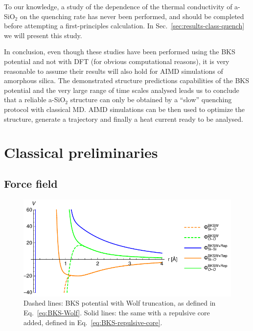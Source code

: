 \medskip
To our knowledge, a study of the dependence of the thermal conductivity of a-SiO$_2$ on the quenching rate has never been performed, and should be completed before attempting a first-principles calculation. In Sec.~\ref{sec:results-class-quench} we will present this study. 

In conclusion, even though these studies have been performed using the BKS potential and not with DFT (for obvious computational reasons), it is very reasonable to assume their results will also hold for AIMD simulations of amorphous silica. 
The demonstrated structure predictions capabilities of the BKS potential and the very large range of time scales analysed leads us to conclude that a reliable a-SiO$_2$ structure can only be obtained by a ``slow'' quenching protocol with classical MD. 
AIMD simulations can be then used to optimize the structure, generate a trajectory and finally a heat current ready to be analysed. 



\section{Classical preliminaries}  \label{sec:results-classical}

\subsection{Force field}  \label{sec:results-class-force-field}
\begin{figure}[!tb]
    \centering
    \includegraphics[]{chapters/chapter6/figures/BKSW.pdf}
    \caption{Dashed lines: BKS potential with Wolf truncation, as defined in Eq.~\eqref{eq:BKS-Wolf}. Solid lines: the same with a repulsive core added, defined in Eq.~\eqref{eq:BKS-repulsive-core}.}
    \label{fig:BKS-potential}
\end{figure}

